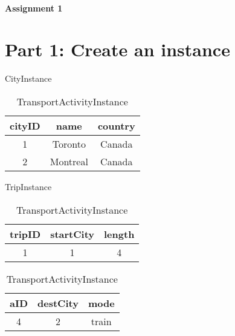 \documentclass{article}
\begin{document}
~~~\vspace{-2.0cm}

\noindent
{\LARGE\bf Assignment 1}

\section*{Part 1: Create an instance}

\begin{table}[H]
\parbox{.3\linewidth}{
    \centering
    \caption*{CityInstance}
    \begin{tabular}{|c|c|c|} 
    \hline
    cityID & name & country \\ [.5ex] 
    \hline\hline
    1 & Toronto & Canada \\
    \hline
    2 & Montreal & Canada \\
    \hline
    \end{tabular}
}
\hfill
\parbox{.3\linewidth}{
    \centering
    \caption*{TripInstance}
    \begin{tabular}{|c|c|c|} 
    \hline
    tripID & startCity & length \\ [.5ex] 
    \hline\hline
    1 & 1 & 4 \\
    \hline
    \end{tabular}
}
\hfill
\parbox{.3\linewidth}{
    \centering
    \caption*{TransportActivityInstance}
    \begin{tabular}{|c|c|c|} 
    \hline
    aID & destCity & mode \\ [.5ex] 
    \hline\hline
    4 & 2 & train \\
    \hline
    \end{tabular}
}
\end{table}
\end{document}
